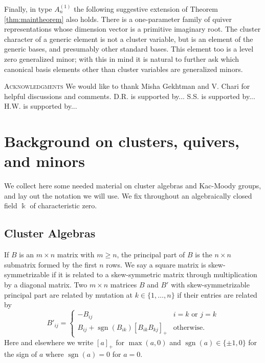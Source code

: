 \documentclass[12pt]{amsart}
\newcommand{\sayHW}[1]{\say[HW]{\color{violet}{\bf HW:}\;#1}}
\newcommand{\sayDR}[1]{\say[DR]{\color{red}{\bf DR:}\;#1}}
\newcommand{\kk}{\Bbbk}%
\newcommand{\sgn}{\operatorname{sgn}}
\theoremstyle{remark}
\numberwithin{equation}{section}
\begin{document}
Finally, in type $A_n^{(1)}$ the following suggestive extension of Theorem \ref{thm:maintheorem} also holds. There is a one-parameter family of quiver representations whose dimension vector is a primitive imaginary root. The cluster character of a generic element is not a cluster variable, but is an element of the generic bases, and presumably other standard bases. This element too is a level zero generalized minor; with this in mind it is natural to further ask which canonical basis elements other than cluster variables are generalized minors.

\textsc{Acknowledgments}  We would like to thank Misha Gekhtman and V. Chari for helpful discussions and comments. D.R. is supported by... S.S. is supported by... H.W. is supported by...

\section{Background on clusters, quivers, and minors}

We collect here some needed material on cluster algebras and Kac-Moody groups, and lay out the notation we will use.  
We fix throughout an algebraically closed field $\kk$ of characteristic zero. 

\subsection{Cluster Algebras}

If $B$ is an $m \times n$ matrix with $m \geq n$, the principal part of $B$ is the $n \times n$ submatrix formed by the first $n$ rows. 
We say a square matrix is skew-symmetrizable if it is related to a skew-symmetric matrix through multiplication by a diagonal matrix. 
Two $m \times n$ matrices $B$ and $B'$ with skew-symmetrizable principal part are related by mutation at $k \in \{1,\dotsc,n\}$ if their entries are related by  
\[
B'_{ij} = \begin{cases}
-B_{ij} & i = k \text{ or } j = k\\
B_{ij} + \sgn(B_{ik})[B_{ik}B_{kj}]_+ & \text{otherwise.}
\end{cases}
\]
Here and elsewhere we write $[a]_+$ for $\max(a,0)$ and $\sgn(a) \in \{\pm 1,0\}$ for the sign of $a$ where $\sgn(a)=0$ for $a=0$. %
\end{document}
